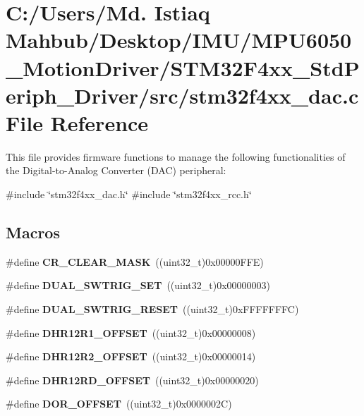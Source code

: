 \section{C\+:/\+Users/\+Md. Istiaq Mahbub/\+Desktop/\+I\+M\+U/\+M\+P\+U6050\+\_\+\+Motion\+Driver/\+S\+T\+M32\+F4xx\+\_\+\+Std\+Periph\+\_\+\+Driver/src/stm32f4xx\+\_\+dac.c File Reference}
\label{stm32f4xx__dac_8c}


This file provides firmware functions to manage the following functionalities of the Digital-\/to-\/\+Analog Converter (D\+AC) peripheral\+:  


{\ttfamily \#include \char`\"{}stm32f4xx\+\_\+dac.\+h\char`\"{}}\newline
{\ttfamily \#include \char`\"{}stm32f4xx\+\_\+rcc.\+h\char`\"{}}\newline
\subsection*{Macros}
\begin{DoxyCompactItemize}
\item 
\#define \textbf{ C\+R\+\_\+\+C\+L\+E\+A\+R\+\_\+\+M\+A\+SK}~((uint32\+\_\+t)0x00000\+F\+F\+E)
\item 
\#define \textbf{ D\+U\+A\+L\+\_\+\+S\+W\+T\+R\+I\+G\+\_\+\+S\+ET}~((uint32\+\_\+t)0x00000003)
\item 
\#define \textbf{ D\+U\+A\+L\+\_\+\+S\+W\+T\+R\+I\+G\+\_\+\+R\+E\+S\+ET}~((uint32\+\_\+t)0x\+F\+F\+F\+F\+F\+F\+F\+C)
\item 
\#define \textbf{ D\+H\+R12\+R1\+\_\+\+O\+F\+F\+S\+ET}~((uint32\+\_\+t)0x00000008)
\item 
\#define \textbf{ D\+H\+R12\+R2\+\_\+\+O\+F\+F\+S\+ET}~((uint32\+\_\+t)0x00000014)
\item 
\#define \textbf{ D\+H\+R12\+R\+D\+\_\+\+O\+F\+F\+S\+ET}~((uint32\+\_\+t)0x00000020)
\item 
\#define \textbf{ D\+O\+R\+\_\+\+O\+F\+F\+S\+ET}~((uint32\+\_\+t)0x0000002\+C)
\end{DoxyCompactItemize}
